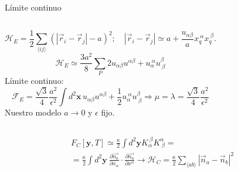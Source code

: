 \documentclass[xcolor=dvipsnames]{beamer}
\begin{document}
\begin{frame}{Límite continuo}
\begin{columns}[T]
    \begin{equation*}
     \mathcal{H}_E=\frac{1}{2}\sum_{\langle
       ij\rangle}(|\vec{r}_i-\vec{r}_j|-a)^2;\quad |\vec{r}_i-\vec{r}_j|\simeq a+\frac{u_{\alpha\beta}}{a}x_q^{\ \alpha}x_q^{\ \beta}. 
    \end{equation*}
    \begin{equation*}
     \mathcal{H}_E\simeq\frac{3a^2}{8}\sum_P 2u_{\alpha\beta}u^{\alpha\beta}+u_{\alpha}^{\ \alpha}u^{\beta}_{\ \beta}
     \end{equation*}
     Límite continuo:
     \begin{equation*}
     \mathcal{F}_E= \frac{\sqrt{3}}{4}\frac{a^2}{\epsilon^2}\int
     d^2\mathbf{x}\,u_{\alpha\beta}u^{\alpha\beta}+\frac{1}{2}u_{\alpha}^{\
       \alpha}u^{\beta}_{\ \beta} \Rightarrow \mu=\lambda= \frac{\sqrt{3}}{4}\frac{a^2}{\epsilon^2}
     \end{equation*}
     Nuestro modelo $a\rightarrow 0$ y $\epsilon$ fijo.
    \begin{figure}[h]
      \resizebox{\columnwidth}{!}{}
    \end{figure} 
\end{columns}
\begin{multline*}
F_C[\mathbf{y},T]\simeq\frac{\kappa}{2}\int d^2\mathbf{y} K_{\alpha}^{\
  \beta}K^{\alpha}_{\ \beta}=\\=\frac{\kappa}{2}\int d^2\mathbf{y}\
\frac{\partial \vec{n_a}}{\partial x_{\alpha}}\cdot\frac{\partial
  \vec{n_a}}{\partial x^{\alpha}} \longrightarrow \mathcal{H}_C=\frac{\kappa}{2}\sum_{\langle ab 
      \rangle}|\vec{n}_a-\vec{n}_b|^2
\end{multline*}
\end{frame}
\end{document}
